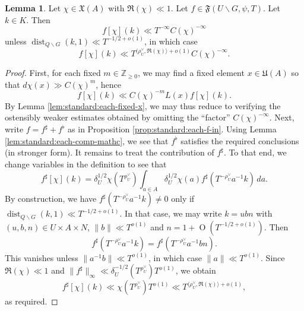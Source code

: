 \documentclass[reqno]{amsart}
\DeclareMathOperator{\dist}{dist}
\def\O{\operatorname{O}}
\theoremstyle{plain} \newtheorem{theorem} {Theorem}
\theoremstyle{definition} \newtheorem{definition} [theorem] {Definition}
\theoremstyle{itplain} %
\newtheorem{lemma}[theorem]{Lemma}
\numberwithin{equation}{section}
\numberwithin{theorem}{section}
\renewcommand{\geq}{\geqslant}
\begin{document}
\begin{lemma}\label{lem:standard:let-chi-in}
  Let $\chi \in \mathfrak{X}(A)$ with $\Re(\chi) \ll 1$.  Let $f \in \mathfrak{F}(U \backslash G, \psi, T)$.  Let $k \in K$.  Then
  \begin{equation*}
    f[\chi](k) \ll T^{-\infty} C(\chi)^{-\infty}
  \end{equation*}
  unless $\dist_{Q \backslash G}(k,1) \ll T^{-1/2+o(1)}$, in which case
  \begin{equation*}
    f[\chi](k) \ll T^{\langle \rho_U^\vee , \Re(\chi) \rangle + o(1)} C(\chi)^{-\infty}.
  \end{equation*}
\end{lemma}
\begin{proof}
  First, for each fixed $m \in \mathbb{Z}_{\geq 0}$, we may find a fixed element $x \in \mathfrak{U}(A)$ so that $d \chi(x) \gg C(\chi)^m$, hence
  \begin{equation*}
    f[\chi](k) \ll C(\chi)^{-m} L(x) f[\chi](k).
  \end{equation*}
  By Lemma \ref{lem:standard:each-fixed-x}, we may thus reduce to verifying the ostensibly weaker estimates obtained by omitting the ``factor'' $C(\chi)^{-\infty}$.  Next, write $f = f ^\sharp + f ^\flat$ as in Proposition \ref{prop:standard:each-f-in}.  Using Lemma \ref{lem:standard:each-comp-mathc}, we see that $f ^\flat$ satisfies the required conclusions (in stronger form).  It remains to treat the contribution of $f ^\sharp$.  To that end, we change variables in the definition to see that
  \begin{equation*}
    f^\sharp[\chi](k) = \delta_U^{1/2} \chi  (T ^{\rho _U ^\vee}) \int _{a \in A} \delta_U^{1/2} \chi(a) f^\sharp(T ^{- \rho _U ^\vee } a^{-1} k) \, d a.
  \end{equation*}
  By construction, we have $f ^\sharp  (T ^{- \rho _U ^\vee } a^{-1} k) \neq 0$ only if $\dist_{Q \backslash G}(k,1) \ll T^{-1/2 + o(1)}$.  In that case, we may write $k = u b n$ with $(u,b,n) \in U \times A \times N$, $\|b\| \ll T^{o(1)}$ and $n = 1 + \O(T^{-1/2+o(1)})$.  Then
  \begin{equation*}
    f ^\sharp (T ^{- \rho _U ^\vee } a ^{-1} k)
    =
    f ^\sharp (T ^{- \rho _U ^\vee } a ^{-1} b n).
  \end{equation*}
  This vanishes unless $\|a^{-1} b \| \ll T^{o(1)}$, in which case $\|a\| \ll T^{o(1)}$.  Since $\Re(\chi) \ll 1$ and $\|f ^\sharp \| _\infty \ll \delta_U^{-1/2}(T^{\rho_U^\vee}) T^{o(1)}$, we obtain
  \begin{equation}\label{eq:f-sharp-chik}
    f ^\sharp [\chi](k) \ll \chi (T ^{\rho_U^\vee })
    T^{o(1)}
    \ll
    T ^{\langle \rho _U ^\vee , \Re(\chi) \rangle + o(1)},
  \end{equation}
  as required.
\end{proof}
\end{document}
